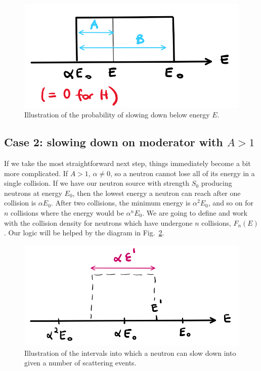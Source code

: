 \begin{figure}[h]
  \centering
  \includegraphics[scale=0.70]{./Figures/P2/slowdownE.png} 
  \caption{Illustration of the probability of slowing down below energy $E$.} 
  \label{fig:prob_collide}
\end{figure}


\subsection{Case 2: slowing down on moderator with $A > 1$}

If we take the most straightforward next step, things immediately become a bit more complicated. If $A>1$, $\alpha \neq 0$, so a neutron cannot lose all of its energy in a single collision. If we have our neutron source with strength $S_0$ producing neutrons at energy $E_0$, then the lowest energy a neutron can reach after one collision is $\alpha E_0$. After two collisions, the minimum energy is $\alpha^2 E_0$, and so on for $n$ collisions where the energy would be $\alpha^n E_0$. We are going to define and work with the collision density for neutrons which have undergone $n$ collisions, $F_n(E)$. Our logic will be helped by the diagram in Fig.~\ref{fig:slowdown_interval}.

\begin{figure}[h]
  \centering
  \includegraphics[scale=0.60]{./Figures/P2/slowdownA.png} 
  \caption{Illustration of the intervals into which a neutron can slow down into given a number of scattering events.} 
  \label{fig:slowdown_interval}
\end{figure}

